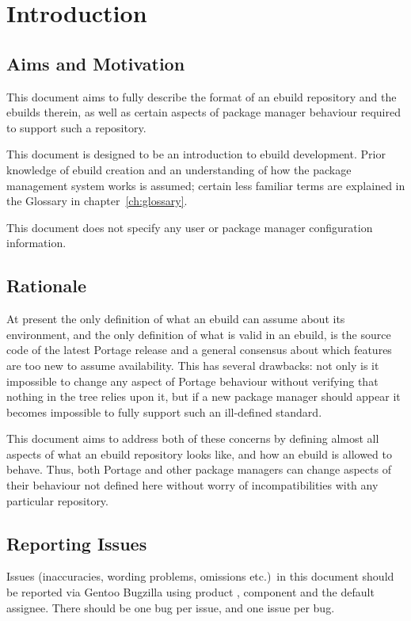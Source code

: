 \chapter{Introduction}

\section{Aims and Motivation}

This document aims to fully describe the format of an ebuild repository and the ebuilds therein, as
well as certain aspects of package manager behaviour required to support such a repository.

This document is  designed to be an introduction to ebuild development. Prior knowledge of
ebuild creation and an understanding of how the package management system works is assumed; certain
less familiar terms are explained in the Glossary in chapter~\ref{ch:glossary}.

This document does not specify any user or package manager configuration information.

\section{Rationale}

At present the only definition of what an ebuild can assume about its environment,
and the only definition of what is valid in an ebuild, is the source code of the latest Portage release
and a general consensus about which features are too new to assume availability. This has several
drawbacks: not only is it impossible to change any aspect of Portage behaviour without verifying
that nothing in the tree relies upon it, but if a new package manager should appear it becomes
impossible to fully support such an ill-defined standard.

This document aims to address both of these concerns by defining almost all aspects of what an
ebuild repository looks like, and how an ebuild is allowed to behave. Thus, both Portage and other
package managers can change aspects of their behaviour not defined here without worry of
incompatibilities with any particular repository.

\section{Reporting Issues}

Issues (inaccuracies, wording problems, omissions etc.)\ in this document should be reported via
Gentoo Bugzilla using product , component  and the default
assignee. There should be one bug per issue, and one issue per bug.


